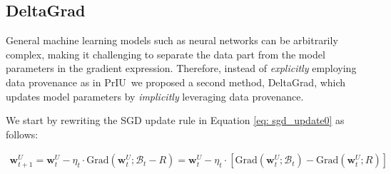 \documentclass[11pt]{article}
\newcommand{\priu}{PrIU}
\newcommand{\deltagrad}{DeltaGrad}
\newcommand{\uw}{\textbf{w}^{U}}
\newcommand{\w}{\textbf{w}}
\newcommand{\x}{\textbf{x}}
\newcommand{\y}{y}
\newcommand{\miniB}{\mathscr{B}}
\begin{document}
\subsection{\deltagrad}
General machine learning models such as neural networks can be arbitrarily complex, making it challenging to separate the data part from the model parameters in the gradient expression. Therefore, instead of \emph{explicitly} employing data provenance as in \priu\ we proposed a second method, \deltagrad, which updates model parameters by \emph{implicitly} leveraging data provenance.

We start by rewriting the SGD update rule in Equation \eqref{eq: sgd_update0} as follows:
\begin{small}
\begin{align}\label{eq: sgd_update1}
\uw_{t+1}= \uw_{t} - \eta_t \cdot \text{Grad}(\uw_t; \miniB_t - R) = \uw_{t} - \eta_t \cdot [\text{Grad}(\uw_t; \miniB_t) - \text{Grad}(\uw_t; R)]
\end{align}
\end{small}
\end{document}
